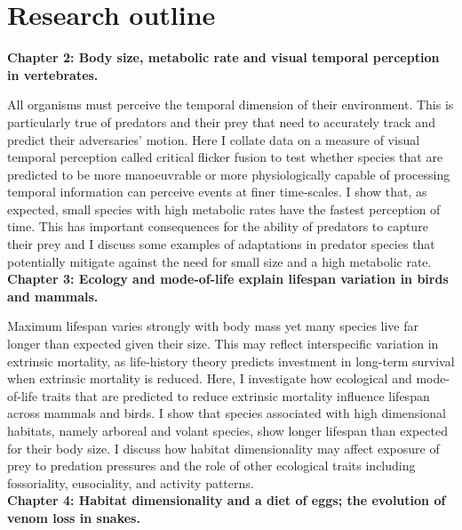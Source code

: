 \section{\uppercase{R}esearch outline}


\textbf{Chapter 2: Body size, metabolic rate and visual temporal perception in vertebrates.}


 All organisms must perceive the temporal dimension of their environment. This is particularly true of predators and their prey that need to accurately track and predict their adversaries' motion. Here I collate data on a measure of visual temporal perception called critical flicker fusion to test whether species that are predicted to be more manoeuvrable or more physiologically capable of processing temporal information can perceive events at finer time-scales. I show that, as expected, small species with high metabolic rates have the fastest perception of time. This has important consequences for the ability of predators to capture their prey and I discuss some examples of adaptations in predator species that potentially mitigate against the need for small size and a high metabolic rate.\\


\textbf{Chapter 3: Ecology and mode-of-life explain lifespan variation in birds and mammals.}


Maximum lifespan varies strongly with body mass yet many species live far longer than expected given their size. This may reflect interspecific variation in extrinsic mortality, as life-history theory predicts investment in long-term survival when extrinsic mortality is reduced. Here, I investigate how ecological and mode-of-life traits that are predicted to reduce extrinsic mortality influence lifespan across mammals and birds. I show that species associated with high dimensional habitats, namely arboreal and volant species, show longer lifespan than expected for their body size. I discuss how habitat dimensionality may affect exposure of prey to predation pressures and the role of other ecological traits including fossoriality, eusociality, and activity patterns.\\




\textbf{Chapter 4: Habitat dimensionality and a diet of eggs; the evolution of venom loss in snakes.}


